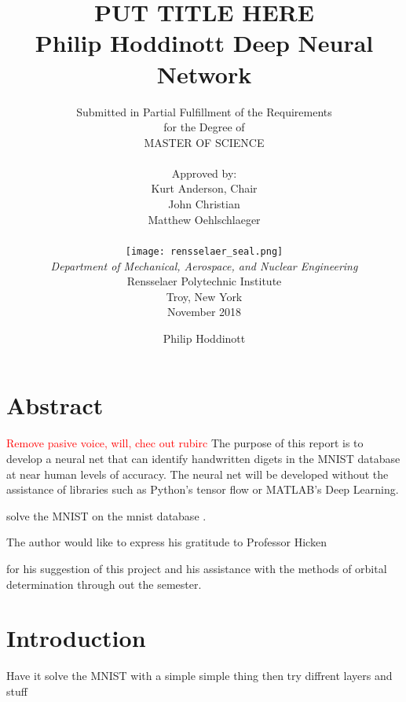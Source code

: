 \documentclass[12pt]{article}
\title{ 
		\LARGE \textbf{\uppercase{Put Title Here}} \\
		\vspace{0.25cm}
		\LARGE \textbf{Philip Hoddinott}
	}
\author{\small{Submitted in Partial Fulfillment of the Requirements} \\ \small{for the Degree of} \\
		\uppercase{Master of Science} \\ \\
		Approved by:
		\\ Kurt Anderson, Chair \\ John Christian \\ Matthew Oehlschlaeger \\ \\ %
		\texttt{[image: rensselaer\_seal.png]} \\
		\small{\textit{Department of Mechanical, Aerospace, and Nuclear Engineering}} \\
		\small{Rensselaer Polytechnic Institute} \\ 
		\small{Troy, New York} \\
		\small{November 2018}
	}
\begin{document}
		\title{Deep Neural Network}
	\author{Philip Hoddinott}
	
	\maketitle


	


	
	



	
	
	\newpage
	\section*{Abstract}
	\textcolor{red}{Remove pasive voice, will, chec out rubirc }
	The purpose of this report is to develop a neural net that can identify handwritten digets in the MNIST database at near human levels of accuracy. The neural net will be developed without the assistance of libraries such as Python's tensor flow or MATLAB's Deep Learning. 
	
	solve the MNIST  on the mnist database
	. \par 
	The author would like to express his gratitude to Professor Hicken
	
	
	 for his suggestion of this project and his assistance with the methods of orbital determination through out the semester.\par 
	
		\newpage
\tableofcontents
\listoffigures
\doublespacing
	\newpage

	\section{Introduction}
	Have it solve the MNIST with a simple simple thing
	then try diffrent layers and stuff
	
\end{document}
